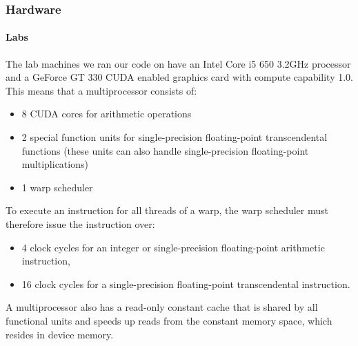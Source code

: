 \subsubsection*{Hardware}
\paragraph{Labs}
  The lab machines we ran our code on have an Intel Core i5 650 3.2GHz processor and a  GeForce GT 330 CUDA enabled graphics card with compute capability 1.0. This means that a multiprocessor consists of\cite{compute_1.0}:
  \begin{itemize}
    \item 8 CUDA cores for arithmetic operations
    \item 2 special function units for single-precision floating-point transcendental functions (these units can also handle single-precision floating-point multiplications)
    \item 1 warp scheduler
  \end{itemize}
  To execute an instruction for all threads of a warp, the warp scheduler must therefore issue the instruction over:
  \begin{itemize}
    \item 4 clock cycles for an integer or single-precision floating-point arithmetic instruction,
    \item 16 clock cycles for a single-precision floating-point transcendental instruction.
  \end{itemize}
  A multiprocessor also has a read-only constant cache that is shared by all functional units and speeds up reads from the constant memory space, which resides in device memory.